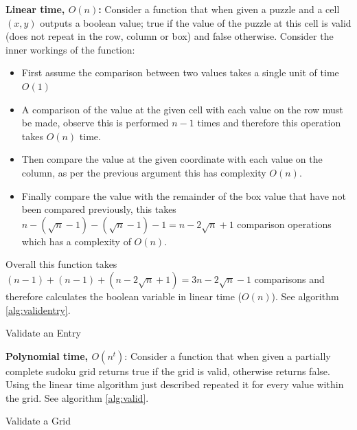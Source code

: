 \documentclass[a4paper,11pt]{report}
\newcounter{row}
\newcounter{col}
\begin{document}
\textbf{Linear time, $O(n)$:} Consider a function that when given a puzzle and a cell $(x,y)$ outputs a boolean value; true if the value of the puzzle at this cell is valid (does not repeat in the row, column or box) and false otherwise. Consider the inner workings of the function: 
\begin{itemize}
\item First assume the comparison between two values takes a single unit of time $O(1)$
\item A comparison of the value at the given cell with each value on the row must be made, observe this is performed $n-1$ times and therefore this operation takes $O(n)$ time.
\item Then compare the value at the given coordinate with each value on the column, as per the previous argument this has complexity $O(n)$.
\item Finally compare the value with the remainder of the box value that have not been compared previously, this takes $n-(\sqrt{n}-1)-(\sqrt{n}-1)-1= n-2\sqrt{n}+1$ comparison operations which has a complexity of $O(n)$.
\end{itemize}
Overall this function takes $(n-1)+(n-1)+(n-2\sqrt{n}+1) = 3n -2\sqrt{n}-1$ comparisons and therefore calculates the boolean variable in linear time ($O(n)$). See algorithm \ref{alg:validentry}.

\begin{algorithm}
\caption{Validate an Entry\label{alg:validentry}}
\begin{algorithmic}
	 
			\EndIf
		\EndIf
	\EndFor
	 
			\EndIf
		\EndIf
	\EndFor
	 
			\EndIf
	\EndFor
\EndProcedure
\end{algorithmic}
\end{algorithm}

\textbf{Polynomial time, $O(n^t)$}: Consider a function that when given a partially complete sudoku grid returns true if the grid is valid, otherwise returns false. Using the linear time algorithm just described repeated it for every value within the grid. See algorithm \ref{alg:valid}.

\begin{algorithm}
\caption{Validate a Grid\label{alg:valid}}
\begin{algorithmic}
	 
			\EndIf
		\EndFor
	\EndFor
\EndProcedure
\end{algorithmic}
\end{algorithm}
\end{document}
